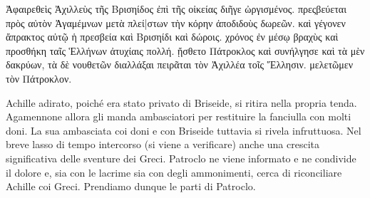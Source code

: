 \documentclass[11pt,a4paper]{book}
\begin{document}
\begin{pages}
\begin{Leftside}
\beginnumbering
\pstart{}
\pend

\pstart
{}
\pend

\pstart
Ἀφαιρεθεὶς Ἀχιλλεὺς τῆς Βρισηίδος ἐπὶ τῆς οἰκείας διῆγε  ὠργισμένος. πρεςβεύεται πρὸς αὐτὸν Ἀγαμέμνων μετὰ πλεί|στων τὴν κόρην ἀποδιδοὺς δωρεῶν. καὶ γέγονεν ἄπρακτος αὐτῷ ἡ πρεσβεία καὶ Βρισηίδι καὶ δώροις. χρόνος ἐν μέσῳ βραχὺς καὶ προσθήκη ταῖς Ἑλλήνων ἀτυχίαις πολλή. ᾔσθετο Πάτροκλος καὶ συνήλγησε καὶ τὰ μὲν δακρύων, τὰ δὲ νουθετῶν διαλλάξαι πειρᾶται τὸν Ἀχιλλέα τοῖς Ἕλλησιν. μελετῶμεν τὸν Πάτροκλον.
\pend

\endnumbering
\end{Leftside}

\begin{Rightside}
\beginnumbering
\numberpstartfalse

\pstart
{}
\pend

\pstart
{}
\pend

\pstart
Achille adirato, poiché era stato privato di Briseide, si ritira nella propria tenda. Agamennone allora gli manda ambasciatori per restituire la fanciulla con molti doni. La sua ambasciata coi doni e con Briseide tuttavia si rivela infruttuosa. Nel breve lasso di tempo intercorso (si viene a verificare) anche una crescita significativa delle sventure dei Greci. Patroclo ne viene informato e ne condivide il dolore e, sia con le lacrime sia con degli ammonimenti, cerca di riconciliare Achille coi Greci. Prendiamo dunque le parti di Patroclo.
\pend

\endnumbering
\end{Rightside}
\end{pages}
\Pages
\end{document}
